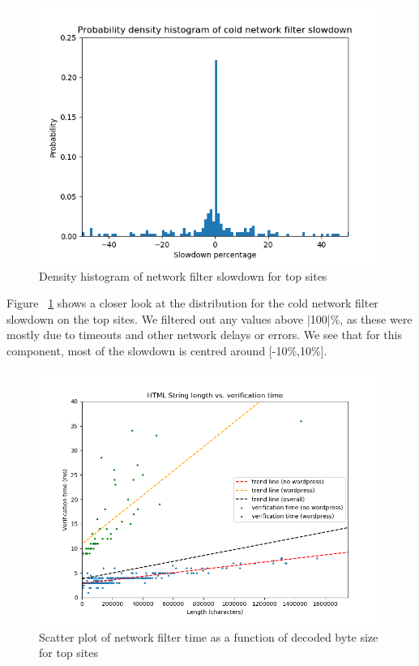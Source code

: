 \begin{figure}[h]
	\includegraphics[scale=0.5]{results/density_histogram_filter_slowdown}
	\caption{Density histogram of network filter slowdown for top sites}
	\label{fig:histogram_slowdown}
\end{figure}


Figure ~\ref{fig:histogram_slowdown} shows a closer look at the distribution for the cold network filter slowdown on the top sites. We filtered out any values above |100|\%, as these were mostly due to timeouts and other network delays or errors. We see that for this component, most of the slowdown is centred around [-10\%,10\%].

\begin{figure}[h]
	\includegraphics[scale=0.4]{results/string_length_vs_verification_time}
	\caption{Scatter plot of network filter time as a function of decoded byte size for top sites}
	\label{fig:verification_time_string_length}
\end{figure}

